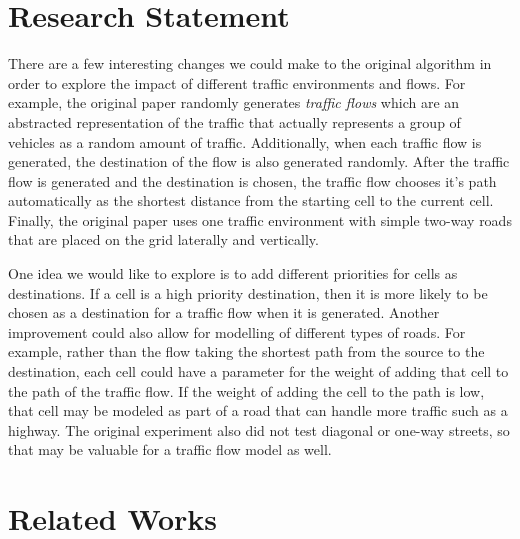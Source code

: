 \documentclass[sigplan,screen]{acmart}
\begin{document}

\maketitle

\section{Research Statement}
There are a few interesting changes we could make to the original algorithm in
order to explore the impact of different traffic environments and flows. For
example, the original paper randomly generates \textit{traffic flows} which are
an abstracted representation of the traffic that actually represents a group of
vehicles as a random amount of traffic. Additionally, when each traffic flow is
generated, the destination of the flow is also generated randomly. After the
traffic flow is generated and the destination is chosen, the traffic flow
chooses it's path automatically as the shortest distance from the starting cell
to the current cell. Finally, the original paper uses one traffic environment
with simple two-way roads that are placed on the grid laterally and vertically.

One idea we would like to explore is to add different priorities for cells as
destinations. If a cell is a high priority destination, then it is more likely
to be chosen as a destination for a traffic flow when it is generated. Another
improvement could also allow for modelling of different types of roads. For
example, rather than the flow taking the shortest path from the source to the
destination, each cell could have a parameter for the weight of adding that cell
to the path of the traffic flow. If the weight of adding the cell to the path is
low, that cell may be modeled as part of a road that can handle more traffic
such as a highway. The original experiment also did not test diagonal or one-way
streets, so that may be valuable for a traffic flow model as well.

\section{Related Works}
          
\end{document}

